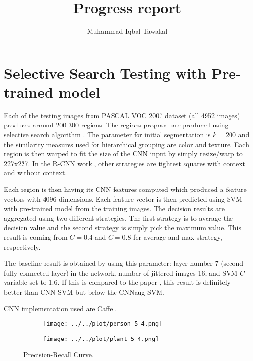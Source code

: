 \documentclass{article}
\author{Muhammad Iqbal Tawakal}
\title{Progress report}
\begin{document}
\maketitle

\section{Selective Search Testing with Pre-trained model}
Each of the testing images from PASCAL VOC 2007 dataset (all 4952 images) produces around 200-300 regions. The regions proposal are produced using selective search algorithm \cite{uijlings2013}. The parameter for initial segmentation is $k=200$ and the similarity measures used for hierarchical grouping are color and texture. Each region is then warped to fit the size of the CNN input by simply resize/warp to 227x227. In the R-CNN work \cite{girshick2013}, other strategies are tightest squares with context and without context.

Each region is then having its CNN features computed which produced a feature vectors with 4096 dimensions. Each feature vector is then predicted using SVM with pre-trained model from the training images. The decision results are aggregated using two different strategies. The first strategy is to average the decision value and the second strategy is simply pick the maximum value. This result is coming from $C=0.4$ and $C=0.8$ for average and max strategy, respectively.

The baseline result is obtained by using this parameter: layer number 7 (second-fully connected layer) in the network, number of jittered images 16, and SVM $C$ variable set to 1.6. If this is compared to the paper \cite{alicvpr2014}, this result is definitely better than CNN-SVM but below the CNNaug-SVM.

CNN implementation used are Caffe \cite{jia2013}.

\begin{figure}[h]
	\begin{subfigure}[h]{0.4\textwidth}
		\texttt{[image: ../../plot/person\_5\_4.png]}
	\end{subfigure}
	\begin{subfigure}[h]{0.4\textwidth}
		\texttt{[image: ../../plot/plant\_5\_4.png]}
	\end{subfigure}
	\caption{Precision-Recall Curve.}
\end{figure}
\end{document}
